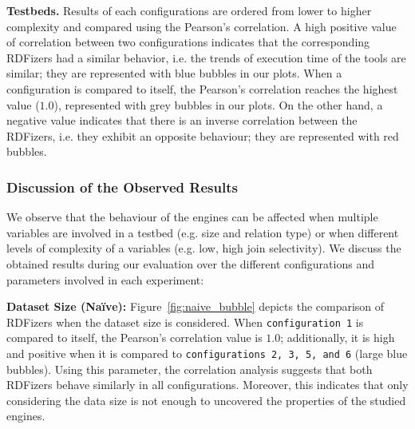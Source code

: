 \begin{figure}[!tb]
{    }
    \label{fig:relation_type_bubble}
\end{figure}


\noindent \textbf{Testbeds.}
Results of each configurations are ordered from lower to higher complexity and compared using the Pearson's correlation. 
A high positive value of correlation between two configurations indicates that the corresponding RDFizers had a similar behavior, i.e. the trends of execution time of the tools are similar; they are represented with blue bubbles in our plots. When a configuration is compared to itself, the Pearson's correlation reaches the highest value ($1.0$), represented with grey bubbles in our plots. 
On the other hand, a negative value indicates that there is an inverse correlation between the RDFizers, i.e. they exhibit an opposite behaviour; they are represented with red bubbles.


\subsubsection*{Discussion of the Observed Results}
We observe that the behaviour of the engines can be affected when multiple variables are involved in a testbed (e.g. size and relation type) or when different levels of complexity of a variables (e.g. low, high join selectivity). We discuss the obtained results during our evaluation over the different configurations and parameters involved in each experiment:   

\noindent \textbf{Dataset Size (Na{\"i}ve):}
Figure~\ref{fig:naive_bubble} depicts the comparison of RDFizers when the dataset size is considered. When \texttt{configuration 1} is compared to itself, the Pearson's correlation value is $1.0$; additionally, it is high and positive when it is compared to \texttt{configurations 2, 3, 5, and 6} (large blue bubbles). 
Using this parameter, the correlation analysis suggests that both RDFizers behave similarly in all configurations. Moreover, this indicates that only considering the data size is not enough to uncovered the properties of the studied engines.


